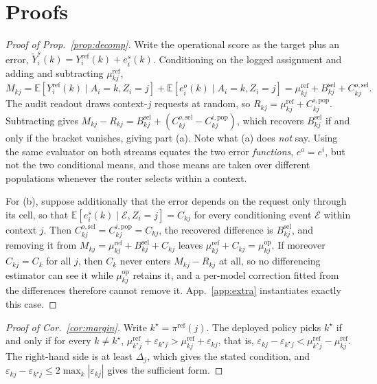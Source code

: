 \documentclass{article}
\theoremstyle{plain}
\theoremstyle{remark}
\newcommand{\Yref}{Y^{\mathrm{ref}}}
\newcommand{\muref}{\mu^{\mathrm{ref}}}
\newcommand{\muop}{\mu^{\mathrm{op}}}
\newcommand{\Bsel}{B^{\mathrm{sel}}}
\newcommand{\piref}{\pi^{\mathrm{ref}}}
\begin{document}
\section{Proofs}\label{app:proof}
\begin{proof}[Proof of Prop.~\ref{prop:decomp}]
Write the operational score as the target plus an error, $\widetilde Y^s_i(k)=\Yref_i(k)+e^s_i(k)$.
Conditioning on the logged assignment and adding and subtracting $\muref_{kj}$,
\[
M_{kj}=\mathbb E\!\left[\Yref_i(k)\mid A_i{=}k,Z_i{=}j\right]
      +\mathbb E\!\left[e^o_i(k)\mid A_i{=}k,Z_i{=}j\right]
=\muref_{kj}+\Bsel_{kj}+C^{o,\mathrm{sel}}_{kj}.
\]
The audit readout draws context-$j$ requests at random, so
$R_{kj}=\muref_{kj}+C^{i,\mathrm{pop}}_{kj}$. Subtracting gives
$M_{kj}-R_{kj}=\Bsel_{kj}+(C^{o,\mathrm{sel}}_{kj}-C^{i,\mathrm{pop}}_{kj})$, which recovers
$\Bsel_{kj}$ if and only if the bracket vanishes, giving part (a). Note what (a) does \emph{not} say.
Using the same evaluator on both streams equates the two error \emph{functions}, $e^o=e^i$, but not
the two conditional means, and those means are taken over different populations whenever the router
selects within a context.

For (b), suppose additionally that the error depends on the request only through its cell, so that
$\mathbb E[e^s_i(k)\mid \mathcal E,Z_i{=}j]=C_{kj}$ for every conditioning event $\mathcal E$ within
context $j$. Then $C^{o,\mathrm{sel}}_{kj}=C^{i,\mathrm{pop}}_{kj}=C_{kj}$, the recovered difference
is $\Bsel_{kj}$, and removing it from $M_{kj}=\muref_{kj}+\Bsel_{kj}+C_{kj}$ leaves
$\muref_{kj}+C_{kj}=\muop_{kj}$. If moreover $C_{kj}=C_k$ for all $j$, then $C_k$ never enters
$M_{kj}-R_{kj}$ at all, so no differencing estimator can see it while $\muop_{kj}$ retains it, and a
per-model correction fitted from the differences therefore cannot remove it. App.~\ref{app:extra}
instantiates exactly this case.
\end{proof}

\begin{proof}[Proof of Cor.~\ref{cor:margin}]
Write $k^\star=\piref(j)$. The deployed policy picks $k^\star$ if and only if for every
$k\neq k^\star$, $\muref_{k^\star j}+\varepsilon_{k^\star j}>\muref_{kj}+\varepsilon_{kj}$, that is,
$\varepsilon_{kj}-\varepsilon_{k^\star j}<\muref_{k^\star j}-\muref_{kj}$. The right-hand side is at
least $\Delta_j$, which gives the stated condition, and
$\varepsilon_{kj}-\varepsilon_{k^\star j}\leq 2\max_k|\varepsilon_{kj}|$ gives the sufficient form.
\end{proof}
\end{document}
